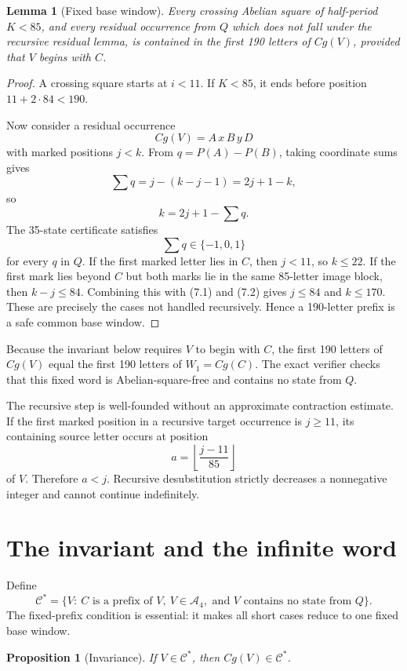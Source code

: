 \documentclass[11pt]{article}
\newtheorem{lemma}[theorem]{Lemma}
\newtheorem{proposition}[theorem]{Proposition}
\theoremstyle{definition}
\newcommand{\A}{\mathcal A_4}
\newcommand{\Par}{P}
\begin{document}
\begin{lemma}[Fixed base window]
Every crossing Abelian square of half-period $K<85$, and every residual occurrence from $Q$ which does not fall under the recursive residual lemma, is contained in the first 190 letters of $Cg(V)$, provided that $V$ begins with $C$.
\end{lemma}

\begin{proof}
A crossing square starts at $i<11$. If $K<85$, it ends before position $11+2\cdot84<190$.

Now consider a residual occurrence
\[
Cg(V)=A\,x\,B\,y\,D
\]
with marked positions $j<k$. From $q=\Par(A)-\Par(B)$, taking coordinate sums gives
\[
\sum q=j-(k-j-1)=2j+1-k,
\]
so
\[
k=2j+1-\sum q.
\tag{7.1}
\]
The 35-state certificate satisfies
\[
\sum q\in\{-1,0,1\}
\tag{7.2}
\]
for every $q$ in $Q$. If the first marked letter lies in $C$, then $j<11$, so $k\le22$. If the first mark lies beyond $C$ but both marks lie in the same 85-letter image block, then $k-j\le84$. Combining this with (7.1) and (7.2) gives $j\le84$ and $k\le170$. These are precisely the cases not handled recursively. Hence a 190-letter prefix is a safe common base window.
\end{proof}

Because the invariant below requires $V$ to begin with $C$, the first 190 letters of $Cg(V)$ equal the first 190 letters of $W_1=Cg(C)$. The exact verifier checks that this fixed word is Abelian-square-free and contains no state from $Q$.

The recursive step is well-founded without an approximate contraction estimate. If the first marked position in a recursive target occurrence is $j\ge11$, its containing source letter occurs at position
\[
a=\left\lfloor\frac{j-11}{85}\right\rfloor
\]
of $V$. Therefore $a<j$. Recursive desubstitution strictly decreases a nonnegative integer and cannot continue indefinitely.

\section{The invariant and the infinite word}

Define
\[
\mathcal C^*=\{V:\ C\text{ is a prefix of }V,\ V\in\A,\text{ and }V\text{ contains no state from }Q\}.
\tag{8.1}
\]
The fixed-prefix condition is essential: it makes all short cases reduce to one fixed base window.

\begin{proposition}[Invariance]
If $V\in\mathcal C^*$, then $Cg(V)\in\mathcal C^*$.
\end{proposition}
\end{document}
